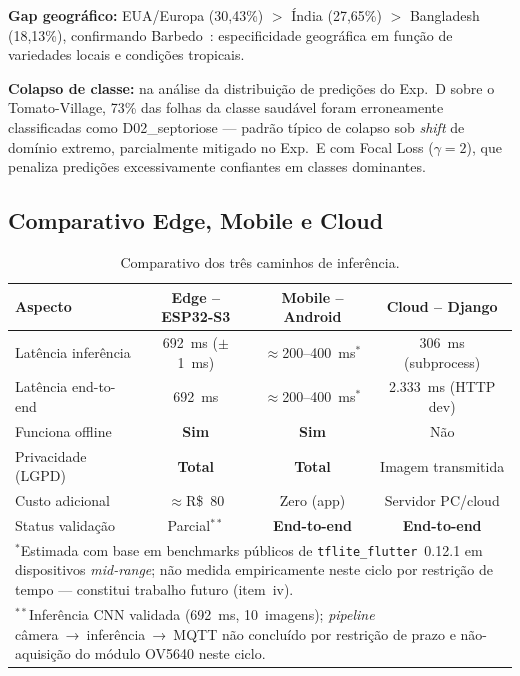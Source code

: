 \documentclass[12pt]{article}
\begin{document}
\textbf{Gap geográfico:} EUA/Europa (30,43\%) $>$ Índia (27,65\%) $>$ Bangladesh
(18,13\%), confirmando Barbedo~\cite{barbedo2019}: especificidade geográfica em
função de variedades locais e condições tropicais.

\textbf{Colapso de classe:} na análise da distribuição de predições do Exp.~D
sobre o Tomato-Village, 73\% das folhas da classe saudável foram erroneamente
classificadas como D02\_septoriose --- padrão típico de colapso sob \textit{shift}
de domínio extremo, parcialmente mitigado no Exp.~E com Focal Loss ($\gamma=2$),
que penaliza predições excessivamente confiantes em classes dominantes.

\subsection{Comparativo Edge, Mobile e Cloud}

\begin{table}[ht]
\centering
\caption{Comparativo dos três caminhos de inferência.}
\label{tab:edge}
\begin{tabular}{@{}lccc@{}}
\toprule
\textbf{Aspecto} & \textbf{Edge -- ESP32-S3} & \textbf{Mobile -- Android} & \textbf{Cloud -- Django} \\
\midrule
Latência inferência & 692~ms ($\pm$1~ms)   & $\approx$200--400~ms$^*$ & 306~ms (subprocess) \\
Latência end-to-end & 692~ms               & $\approx$200--400~ms$^*$ & 2.333~ms (HTTP dev) \\
Funciona offline    & \textbf{Sim}         & \textbf{Sim}             & Não \\
Privacidade (LGPD)  & \textbf{Total}       & \textbf{Total}           & Imagem transmitida \\
Custo adicional     & $\approx$R\$~80      & Zero (app)               & Servidor PC/cloud \\
\midrule
Status validação    & Parcial$^{**}$       & \textbf{End-to-end}      & \textbf{End-to-end} \\
\bottomrule
\multicolumn{4}{p{0.9\linewidth}}{\footnotesize $^*$Estimada com base em
benchmarks públicos de \texttt{tflite\_flutter}~0.12.1 em dispositivos
\textit{mid-range}; não medida empiricamente neste ciclo por restrição de tempo
--- constitui trabalho futuro (item~iv).} \\
\multicolumn{4}{p{0.9\linewidth}}{\footnotesize $^{**}$Inferência CNN validada
(692~ms, 10~imagens); \textit{pipeline} câmera~→~inferência~→~MQTT não concluído
por restrição de prazo e não-aquisição do módulo OV5640 neste ciclo.}
\end{tabular}
\end{table}
\end{document}
